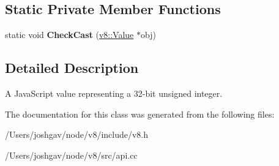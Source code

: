 \subsection*{Static Private Member Functions}
\begin{DoxyCompactItemize}
\item 
static void {\bfseries Check\+Cast} (\hyperlink{classv8_1_1_value}{v8\+::\+Value} $\ast$obj)\hypertarget{classv8_1_1_uint32_a703a3c0235f326eb454fde0724618d58}{}\label{classv8_1_1_uint32_a703a3c0235f326eb454fde0724618d58}

\end{DoxyCompactItemize}


\subsection{Detailed Description}
A Java\+Script value representing a 32-\/bit unsigned integer. 

The documentation for this class was generated from the following files\+:\begin{DoxyCompactItemize}
\item 
/\+Users/joshgav/node/v8/include/v8.\+h\item 
/\+Users/joshgav/node/v8/src/api.\+cc\end{DoxyCompactItemize}
